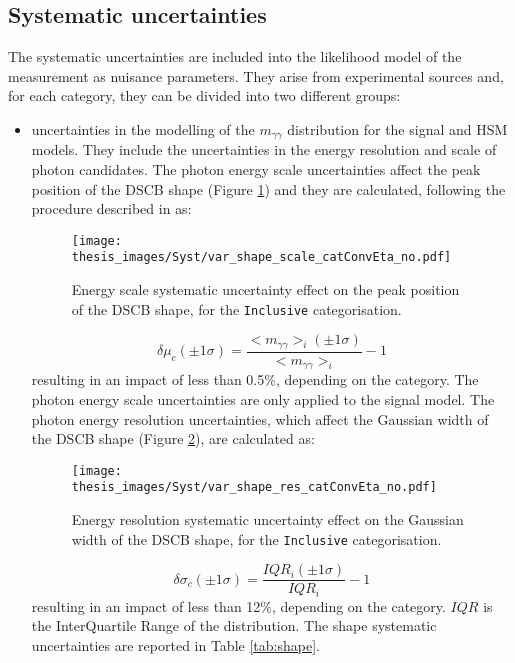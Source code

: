 \documentclass[a4paper, oneside, 11pt, openright]{book}
\begin{document}
 			
 			
 			\subsection{Systematic uncertainties}\label{section:syst}
 				The systematic uncertainties are included into the likelihood model of the measurement as nuisance parameters. They arise from experimental sources and, for each category, they can be divided into two different groups: 
 				\begin{itemize}
 					\item uncertainties in the modelling of the $m_{\gamma\gamma}$ distribution for the signal and HSM models. They include the uncertainties in the energy resolution and scale of photon candidates. The photon energy scale uncertainties affect the peak position of the DSCB shape (Figure \ref{fig:scale_syst}) and they are calculated, following the procedure described in \cite{Aad_2019} as:
 					\begin{figure}
 						\centering
 						\texttt{[image: thesis\_images/Syst/var\_shape\_scale\_catConvEta\_no.pdf]}
 						\caption{Energy scale systematic uncertainty effect on the peak position of the DSCB shape, for the \texttt{Inclusive} categorisation.}
 						\label{fig:scale_syst}
 					\end{figure}
 					\begin{equation}\label{eq:shape_syst}
 						\delta\mu_c(\pm1\sigma)=\frac{<m_{\gamma\gamma}>_i(\pm1\sigma)}{<m_{\gamma\gamma}>_i} -1
 					\end{equation}
 					resulting in an impact of less than 0.5\%, depending on the category. The photon energy scale uncertainties are only applied to the signal model. The photon energy resolution uncertainties, which affect the Gaussian width of the DSCB shape (Figure \ref{fig:res_syst}), are calculated \cite{Aad_2019} as:
 					\begin{figure}
 						\centering
 						\texttt{[image: thesis\_images/Syst/var\_shape\_res\_catConvEta\_no.pdf]}
 						\caption{Energy resolution systematic uncertainty effect on the Gaussian width of the DSCB shape, for the \texttt{Inclusive} categorisation.}
 						\label{fig:res_syst}
 					\end{figure}
 					\begin{equation}\label{eq:res_syst}
 						\delta\sigma_c(\pm1\sigma)=\frac{IQR_i(\pm1\sigma)}{IQR_i}-1
 					\end{equation}
 					resulting in an impact of less than 12\%, depending on the category. $IQR$ is the InterQuartile Range of the distribution. The shape systematic uncertainties are reported in Table \ref{tab:shape}.

\end{itemize}
\end{document}
